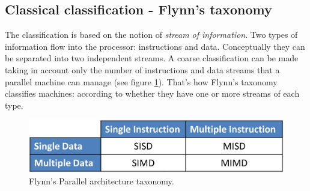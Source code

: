 \subsection{Classical classification - Flynn's taxonomy}
\label{sec:flynn_tax}
The classification is based on the notion of  \textit{stream of information}.
Two types of information flow into the processor: instructions and data.
Conceptually they can be separated into two independent streams. A coarse
classification can be made taking in account only the number of instructions and
 data streams that a parallel machine can manage (see figure \ref{fig:parallelClassification1}).
That's how Flynn's taxonomy\cite{Flynn1972} classifies machines: according to
whether they have one or more streams of each type.
\begin{figure}
\includegraphics[width=1.0\textwidth]{./images/parallel_programming/parallelClassification}
\caption[Flynn's Parallel architecture taxonomy]{Flynn's Parallel architecture taxonomy.}
\label{fig:parallelClassification1}
\end{figure}
